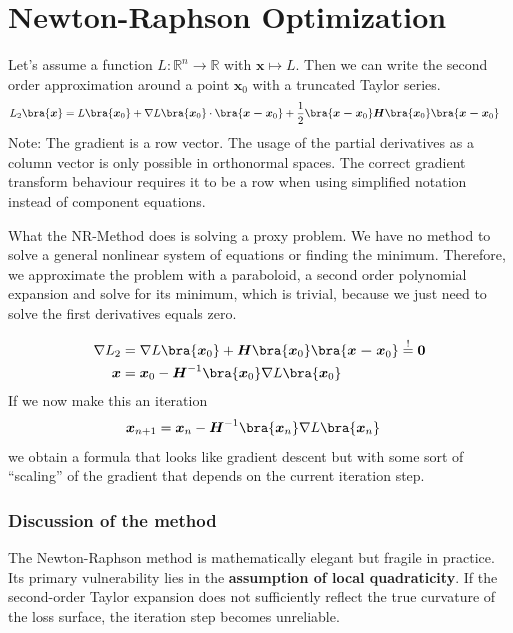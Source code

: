 \section{Newton-Raphson Optimization}
Let's assume a function $L:\mathbb{R}^n\to\mathbb{R}$ with $\boldsymbol{x}\mapsto L$. Then we can write the second order approximation around a point $\boldsymbol{x}_0$ with a truncated Taylor series.
\begin{align}
	\label{eq:taylor2}
	L_2\bra{\boldsymbol{x}}&= L\bra{\boldsymbol{x}_0}+\nabla L\bra{\boldsymbol{x}_0}\cdot\bra{\boldsymbol{x-x}_0}+\frac{1}{2}\bra{\boldsymbol{x-x}_0}\boldsymbol{H}\bra{\boldsymbol{x}_0}\bra{\boldsymbol{x-x}_0}
\end{align}
Note: The gradient is a row vector. The usage of the partial derivatives as a column vector is only possible in orthonormal spaces. The correct gradient transform behaviour requires it to be a row when using simplified notation instead of component equations.\par
What the NR-Method does is solving a proxy problem. We have no method to solve a general nonlinear system of equations or finding the minimum. Therefore, we approximate the problem with a paraboloid, a second order polynomial expansion and solve for its minimum, which is trivial, because we just need to solve the first derivatives equals zero.\par
\begin{align}
	\label{eq:taylor22}
	\nabla L_2&=\nabla L\bra{\boldsymbol{x}_0}+\boldsymbol{H}\bra{\boldsymbol{x}_0}\bra{\boldsymbol{x-x}_0}\overset{!}{=}\boldsymbol{0}\\
	\boldsymbol{x}&=\boldsymbol{x}_0-\boldsymbol{H}^{-1}\bra{\boldsymbol{x}_0}\nabla L \bra{\boldsymbol{x}_0}
\end{align}
If we now make this an iteration
\begin{align}
	\label{eq:nr}
	\boldsymbol{x}_{n+1}&=\boldsymbol{x}_n-\boldsymbol{H}^{-1}\bra{\boldsymbol{x}_n}\nabla L \bra{\boldsymbol{x}_n}
\end{align}
we obtain a formula that looks like gradient descent but with some sort of \enquote{scaling} of the gradient that depends on the current iteration step.
\subsubsection{Discussion of the method}
The Newton-Raphson method is mathematically elegant but fragile in practice. Its primary vulnerability lies in the \textbf{assumption of local quadraticity}. If the second-order Taylor expansion does not sufficiently reflect the true curvature of the loss surface, the iteration step becomes unreliable. 

